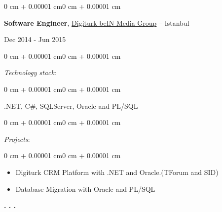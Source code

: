 \documentclass[10pt, letterpaper]{article}
\newenvironment{highlights}{
    \begin{itemize}[
        topsep=0.10 cm,
        parsep=0.10 cm,
        partopsep=0pt,
        itemsep=0pt,
        leftmargin=0 cm + 10pt]
}{
    \end{itemize}} %
\newenvironment{onecolentry}{
    \begin{adjustwidth}{0 cm + 0.00001 cm}{0 cm + 0.00001 cm}
}{
    \end{adjustwidth}}
\newenvironment{twocolentry}[2][]{
    \onecolentry
    \def\secondColumn{#2}
    \setcolumnwidth{\fill, 4.5 cm}
    \begin{paracol}{2}
}{
    \switchcolumn \raggedleft \secondColumn
    \end{paracol}
    \endonecolentry
} %
\begin{document}
        \begin{twocolentry}{Dec 2014 - Jun 2015}
            \textbf{Software Engineer}, \href{https://www.beinconnect.com.tr/}{Digiturk beIN Media Group} -- Istanbul
        \end{twocolentry}
            \begin{onecolentry}
                \textit{Technology stack}:
            \end{onecolentry}
            \begin{onecolentry}
                \begin{highlights}
                    .NET, C\#, SQLServer, Oracle and PL/SQL
                \end{highlights}
            \end{onecolentry}
            \vspace{0.2 cm}
            \begin{onecolentry}
                \textit{Projects}:
            \end{onecolentry}
            \begin{onecolentry}
                \begin{highlights}
                    \item Digiturk CRM Platform with .NET and Oracle.(TForum and SID)
                    \item Database Migration with Oracle and PL/SQL
                \end{highlights}
            \end{onecolentry}
            \vspace{0.5 cm}

        \begin{center}
            \textbf{. . .}
        \end{center}
\end{document}
